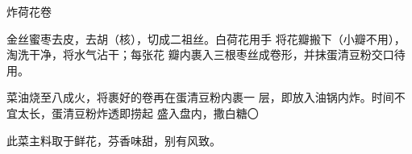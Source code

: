 \begin{recipe}{炸荷花卷}

\ingredients


\cooking

金丝蜜枣去皮，去胡（核），切成二祖丝。白荷花用手 将花瓣搬下（小瓣不用），淘洗干净，将水气沾干；每张花 瓣内裹入三根枣丝成卷形，并抹蛋清豆粉交口待用。

\step 菜油烧至八成火，将裹好的卷再在蛋清豆粉内裹一 层，即放入油锅内炸。时间不宜太长，蛋清豆粉炸透即捞起 盛入盘内，撒白糖〇

\notes

此菜主料取于鲜花，芬香味甜，别有风致。

\end{recipe}

